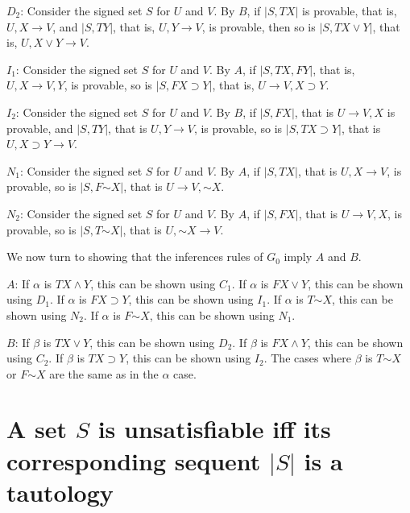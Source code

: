 \documentclass{article}
\newcommand*{\oldneg}{\mathord{\sim}}
\theoremstyle{definition}
\begin{document}
$D_2$: Consider the signed set $S$ for $U$ and $V$. By $B$, if $|S,TX|$ is provable, that is, $U,X\rightarrow V$, and $|S,TY|$, that is, $U,Y\rightarrow V$, is provable, 
then so is $|S,TX\vee Y|$, that is, $U,X\vee Y\rightarrow V$.


$I_1$: Consider the signed set $S$ for $U$ and $V$. By $A$, if $|S,TX,FY|$, that is, $U,X\rightarrow V,Y$, is provable, so is $|S,FX\supset Y|$, that is, 
$U\rightarrow V,X\supset Y$.


$I_2$: Consider the signed set $S$ for $U$ and $V$. By $B$, if $|S,FX|$, that is $U\rightarrow V,X$ is provable, and $|S,TY|$, that is $U,Y\rightarrow V$, is provable, 
so is $|S,TX\supset Y|$, that is $U,X\supset Y\rightarrow V$.


$N_1$: Consider the signed set $S$ for $U$ and $V$. By $A$, if $|S,TX|$, that is $U,X\rightarrow V$, is provable, so is $|S,F\oldneg X|$, that is $U\rightarrow V,\oldneg X$.


$N_2$: Consider the signed set $S$ for $U$ and $V$. By $A$, if $|S,FX|$, that is $U\rightarrow V,X$, is provable, so is $|S,T\oldneg X|$, that is $U,\oldneg X\rightarrow V$.


We now turn to showing that the inferences rules of $G_0$ imply $A$ and $B$.


$A$: If $\alpha$ is $TX\wedge Y$, this can be shown using $C_1$. If $\alpha$ is $FX\vee Y$, this can be shown using $D_1$. If $\alpha$ is $FX\supset Y$, this can be shown 
using $I_1$. If $\alpha$ is $T\oldneg X$, this can be shown using $N_2$. If $\alpha$ is $F\oldneg X$, this can be shown using $N_1$.

$B$: If $\beta$ is $TX\vee Y$, this can be shown using $D_2$. If $\beta$ is $FX\wedge Y$, this can be shown using $C_2$. If $\beta$ is $TX\supset Y$, this can be shown 
using $I_2$. The cases where $\beta$ is $T\oldneg X$ or $F\oldneg X$ are the same as in the $\alpha$ case.

\section*{A set $S$ is unsatisfiable iff its corresponding sequent $|S|$ is a tautology}
\end{document}
